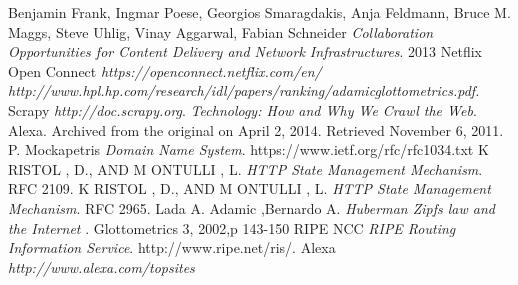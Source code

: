 \begin{thebibliography}{}
Benjamin Frank, Ingmar Poese, Georgios Smaragdakis,
Anja Feldmann, Bruce M. Maggs, Steve Uhlig,
Vinay Aggarwal, Fabian Schneider
\textit{Collaboration Opportunities for
Content Delivery and Network Infrastructures}.
2013
Netflix Open Connect
\textit{https://openconnect.netflix.com/en/}
\textit{http://www.hpl.hp.com/research/idl/papers/ranking/adamicglottometrics.pdf.}
Scrapy
\textit{http://doc.scrapy.org}.
\textit{Technology: How and Why We Crawl the Web}. 
Alexa. Archived from the original on April 2, 2014. Retrieved November 6, 2011.
P. Mockapetris
\textit{Domain Name System}.
https://www.ietf.org/rfc/rfc1034.txt
K RISTOL , D., AND M ONTULLI , L. 
\textit{HTTP State Management Mechanism}.
RFC 2109.
K RISTOL , D., AND M ONTULLI , L.
\textit{HTTP State Management Mechanism}.
RFC 2965.
Lada A. Adamic ,Bernardo A. 
\textit{Huberman Zipfs law and the Internet} . 
Glottometrics 3, 2002,p 143-150
RIPE NCC
\textit{RIPE Routing Information Service}.
http://www.ripe.net/ris/.
Alexa
\textit{http://www.alexa.com/topsites}
\end{thebibliography}
